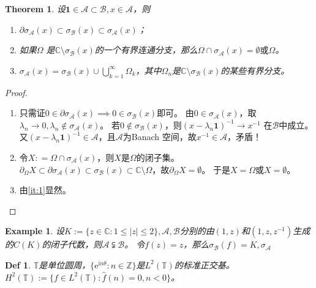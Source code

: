 \documentclass{ctexart}
\newtheorem{definition}{Def}
\newtheorem{example}{Example}
\newtheorem{theorem}{Theorem}
\begin{document}
\begin{theorem}\label{the:shc_subset}
  设\(\mathbf{1} \in \mathcal{A} \subset \mathcal{B},x \in \mathcal{A} \)，则
  \begin{enumerate}
    \item \(\partial \sigma_{\mathcal{A}}(x) \subset \sigma_{\mathcal{B}}(x) \subset \sigma_{\mathcal{A}}(x)\)；
    \item \label{it:1} 如果\(\Omega \) 是\(\mathbb{C} \setminus \sigma_{\mathcal{B}}(x) \)的一个有界连通分支，那么\(\Omega \cap \sigma_{\mathcal{A}}(x)=\emptyset \text{或} \Omega \)。
    \item \(\sigma_{\mathcal{A}}(x) = \sigma_{\mathcal{B}}(x) \cup \bigcup_{k = 1}^{\infty} \Omega_k \)，其中\(\Omega_n \)是\(\mathbb{C} \setminus \sigma_{\mathcal{B}}(x) \)的某些有界分支。
  \end{enumerate}
\end{theorem}
\begin{proof}
  \begin{enumerate}
    \item 只需证\(0 \in \partial \sigma_{\mathcal{A}}(x) \implies 0 \in \sigma_{\mathcal{B}}(x) \)即可。
      由\(0 \in \sigma_{\mathcal{A}}(x) \)，取\(\lambda_n \to 0,\lambda_n \notin \sigma_{\mathcal{A}}(x) \)。
      若\(0 \notin \sigma_{\mathcal{B}}(x) \)，则\((x - \lambda_n \mathbf{1})^{-1} \to x^{-1} \) 在\(\mathcal{B} \)中成立。
      又\((x - \lambda_n \mathbf{1})^{-1} \in \mathcal{A} \)，且\(\mathcal{A} \)为Banach 空间，故\(x^{-1} \in \mathcal{A} \)，矛盾！
    \item 令\(X : = \Omega \cap \sigma_{\mathcal{A}}(x) \)，则\(X \)是\(\Omega \)的闭子集。
      \(\partial_{\Omega} X \subset \partial \sigma_{\mathcal{A}}(x) \subset \sigma_{\mathcal{B}}(x) \subset \mathbb{C} \setminus \Omega \)，故\(\partial_{\Omega} X = \emptyset \)。
      于是\(X = \Omega \)或\(X = \emptyset \)。
    \item 由\ref{it:1}显然。
  \end{enumerate}
\end{proof}
\begin{example}\label{exa:shc_subset}
  设\(K:= \{z \in \mathbb{C}:1 \leq |z| \leq 2\},\mathcal{A},\mathcal{B} \)分别的由\((1,z) \)和\((1,z,z^{-1}) \)生成的\(C(K) \)的闭子代数，则\(\mathcal{A} \subsetneqq \mathcal{B} \)。
  令\(f(z) = z \)，那么\(\sigma_{\mathcal{B}}(f) = K,\sigma_{\mathcal{A}} \)
\end{example}
\begin{definition}\label{def:l2_t}
  \(\mathbb{T} \)是单位圆周，\(\{\mathrm{e}^{\mathrm{i} n \theta}:n \in \mathbb{Z}\} \)是\(L^2(\mathbb{T}) \)的标准正交基。
  \(H^2(\mathbb{T}) := \{f \in L^2(\mathbb{T}): \hat{f}(n)= 0,n <0\} \)。
\end{definition}
\end{document}
